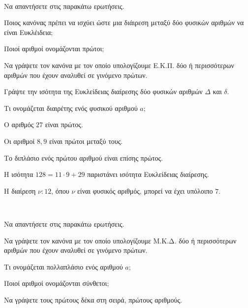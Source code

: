 \documentclass[ektypwsh]{diag-xelatex}
\begin{document}
\thewria
\begin{thema}
\item \mbox{}\\\vspace{-7mm}
\begin{erwthma}
\item Να απαντήσετε στις παρακάτω ερωτήσεις.
\begin{rlist}
\item Ποιος κανόνας πρέπει να ισχύει ώστε μια διάιρεση μεταξύ δύο φυσικών αριθμών να είναι Ευκλέιδεια;
\item Ποιοί αριθμοί ονομάζονται πρώτοι;
\item Να γράψετε τον κανόνα με τον οποίο υπολογίζουμε Ε.Κ.Π. δύο ή περισσότερων αριθμών που έχουν αναλυθεί σε γινόμενο πρώτων.
\item Γράψτε την ισότητα της Ευκλείδειας διαίρεσης δύο φυσικών αριθμών $ \varDelta $ και $ \delta $.
\item Τι ονομάζεται διαιρέτης ενός φυσικού αριθμού $ a $;
\end{rlist}
\item \swstolathos
\begin{rlist}
\item Ο αριθμός $ 27 $ είναι πρώτος.
\item Οι αριθμοί $ 8,9 $ είναι πρώτοι μεταξύ τους.
\item Το διπλάσιο ενός πρώτου αριθμού είναι επίσης πρώτος.
\item Η ισότητα $ 128=11\cdot9+29 $ παριστάνει ισότητα Ευκλείδειας διαίρεσης.
\item Η διαίρεση $ \nu:12 $, όπου $ \nu $ είναι φυσικός αριθμός, μπορεί να έχει υπόλοιπο $ 7 $.
\end{rlist}
\end{erwthma}
\item \mbox{}\\\vspace{-7mm}
\begin{erwthma}
\item Να απαντήσετε στις παρακάτω ερωτήσεις.
\begin{rlist}
\item Να γράψετε τον κανόνα με τον οποίο υπολογίζουμε Μ.Κ.Δ. δύο ή περισσότερων αριθμών που έχουν αναλυθεί σε γινόμενο πρώτων.
\item Τι ονομάζεται πολλαπλάσιο ενός αριθμού $ a $;
\item Ποιοί αριθμοί ονομάζονται σύνθετοι;
\item Να γράψετε τους πρώτους δέκα στη σειρά, πρώτους αριθμούς.

\end{rlist}
\end{erwthma}
\end{thema}
\end{document}
